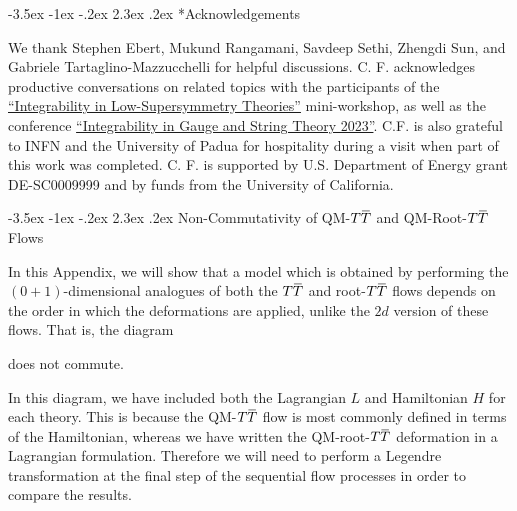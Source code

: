 \documentclass[12pt]{article}
\makeatletter
\numberwithin{equation}{section}
\renewcommand\section{\@startsection {section}{1}{\z@}%
                                   {-3.5ex \@plus -1ex \@minus -.2ex}%
                                   {2.3ex \@plus.2ex}%
                                   {\normalfont\large\bfseries}}
\newcommand{\overbar}[1]{\mkern 1.5mu\overline{\mkern-1.5mu#1\mkern-1.5mu}\mkern 1.5mu}
\def\TT{{T\overbar{T}}}
\makeatother
\begin{document}
\section*{Acknowledgements}

We thank Stephen Ebert, Mukund Rangamani, Savdeep Sethi, Zhengdi Sun, and Gabriele Tartaglino-Mazzucchelli for helpful discussions. C. F. acknowledges productive conversations on related topics with the participants of the \href{https://sites.google.com/view/intropea2023/home#h.ksnkkrrvun8q}{``Integrability in Low-Supersymmetry Theories''} mini-workshop, as well as the conference \href{https://indico.phys.ethz.ch/event/49/}{``Integrability in Gauge and String Theory 2023''}. C.F. is also grateful to INFN and the University of Padua for hospitality during a visit when part of this work was completed. C. F. is supported by U.S. Department of Energy grant DE-SC0009999 and by funds from the University of California.

\appendix

\section{Non-Commutativity of QM-$\TT$ and QM-Root-$\TT$ Flows}\label{app:other}

In this Appendix, we will show that a model which is obtained by performing the $(0+1)$-dimensional analogues of both the $\TT$ and root-$\TT$ flows depends on the order in which the deformations are applied, unlike the $2d$ version of these flows. That is, the diagram
%
\begin{center}
\end{center}
%
does not commute.

In this diagram, we have included both the Lagrangian $L$ and Hamiltonian $H$ for each theory. This is because the QM-$\TT$ flow is most commonly defined in terms of the Hamiltonian, whereas we have written the QM-root-$\TT$ deformation in a Lagrangian formulation. Therefore we will need to perform a Legendre transformation at the final step of the sequential flow processes in order to compare the results.
\end{document}
